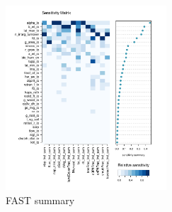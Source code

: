 \documentclass[gmd, manuscript]{copernicus}
\begin{document}
\begin{figure}[t]
\includegraphics[width=6cm]{./graphics/FAST_sensmat_YAnom_level1a.pdf}
\caption{FAST summary}
\label{fig:FAST_sensmat_YAnom_level1a}
\end{figure}



\noappendix       %




\appendixfigures  %

\appendixtables   %





\end{document}
